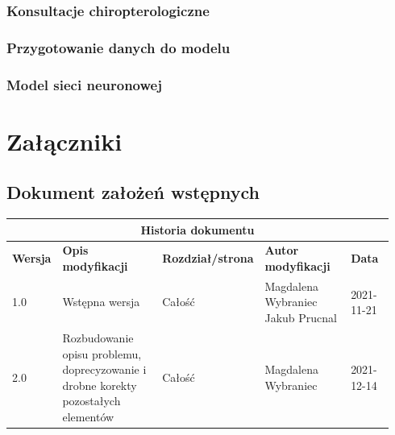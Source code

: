 \documentclass{sprz}
\begin{document}
\subsection{Konsultacje chiropterologiczne}

\subsection{Przygotowanie danych do modelu}

\subsection{Model sieci neuronowej}


\chapter{Załączniki}

\section{Dokument założeń wstępnych}

\begin{documenttable}[]
\end{documenttable}
\begin{center}
  \begin{tabular}{ |p{0.1\linewidth}|p{0.28\linewidth}|p{0.2\linewidth}|p{0.24\linewidth}|p{0.12\linewidth}| }
    \hline
    \multicolumn{5}{|c|}{\textbf{Historia dokumentu}} \\
    \hline
    \textbf{Wersja} & \textbf{Opis modyfikacji} & \textbf{Rozdział/strona} & \textbf{Autor modyfikacji} & \textbf{Data}\\
    \hline
    {1.0} & {Wstępna wersja} & {Całość} & {Magdalena Wybraniec \newline Jakub Prucnal} & {2021-11-21}\\
    \hline
    {2.0} & {Rozbudowanie opisu problemu, doprecyzowanie i drobne korekty pozostałych elementów} &
    {Całość} & {Magdalena Wybraniec} & {2021-12-14}\\
    \hline
  \end{tabular}
\end{center}
\end{document}
